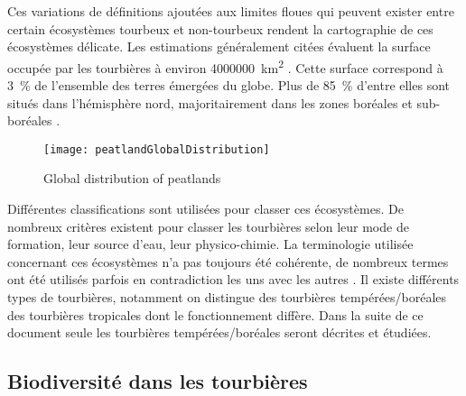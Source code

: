 Ces variations de définitions ajoutées aux limites floues qui peuvent exister entre certain écosystèmes tourbeux et non-tourbeux rendent la cartographie de ces écosystèmes délicate.
Les estimations généralement citées évaluent la surface occupée par les tourbières à environ \SI{4000000}{\square\kilo\meter} \cite{lappalainen1996}. 
Cette surface correspond à \SI{3}{\percent} de l'ensemble des terres émergées du globe.
Plus de \SI{85}{\percent} d'entre elles sont situés dans l'hémisphère nord, majoritairement dans les zones boréales et sub-boréales \cite{society2008}.

\begin{figure}
\centering
\texttt{[image: peatlandGlobalDistribution]}
\caption{Global distribution of peatlands}
\label{peatlandGlobalDistribution} 
\end{figure}

Différentes classifications sont utilisées pour classer ces écosystèmes.
De nombreux critères existent pour classer les tourbières selon leur mode de formation, leur source d'eau, leur physico-chimie.
La terminologie utilisée concernant ces écosystèmes n'a pas toujours été cohérente, de nombreux termes ont été utilisés parfois en contradiction les uns avec les autres \cite{joosten2002}.
Il existe différents types de tourbières, notamment on distingue des tourbières tempérées/boréales des tourbières tropicales dont le fonctionnement diffère.
Dans la suite de ce document seule les tourbières tempérées/boréales seront décrites et étudiées.

\subsection{Biodiversité dans les tourbières}


